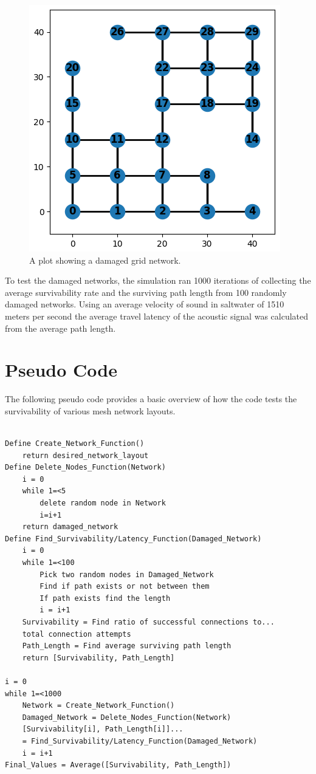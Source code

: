 \documentclass[10pt]{article}
\begin{document}
\begin{figure}
\begin{center}
\includegraphics[width=0.33\columnwidth]{figures/DamagedGridLayout.png}
\end{center}
\caption{A plot showing a damaged grid network.}
\end{figure}

To test the damaged networks, the simulation ran 1000 iterations of collecting the average survivability rate and the surviving path length from 100 randomly damaged networks. Using an average velocity of sound in saltwater of 1510 meters per second the average travel latency of the acoustic signal was calculated from the average path length.

\section{Pseudo Code}
The following pseudo code provides a basic overview of how the code tests the survivability of various mesh network layouts. 
\lstset{basicstyle=\footnotesize}
\begin{lstlisting}

Define Create_Network_Function()
	return desired_network_layout
Define Delete_Nodes_Function(Network)
	i = 0
	while 1=<5
		delete random node in Network 
		i=i+1
	return damaged_network
Define Find_Survivability/Latency_Function(Damaged_Network)
	i = 0
	while 1=<100
		Pick two random nodes in Damaged_Network
		Find if path exists or not between them
		If path exists find the length
		i = i+1
	Survivability = Find ratio of successful connections to... 
	total connection attempts
	Path_Length = Find average surviving path length
	return [Survivability, Path_Length]

i = 0
while 1=<1000
	Network = Create_Network_Function()
	Damaged_Network = Delete_Nodes_Function(Network)
	[Survivability[i], Path_Length[i]]...
	= Find_Survivability/Latency_Function(Damaged_Network)
	i = i+1
Final_Values = Average([Survivability, Path_Length])
\end{lstlisting}
\end{document}
